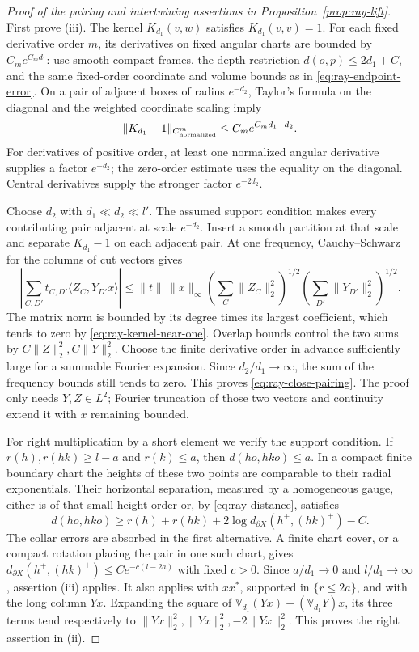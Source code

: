 \begin{proof}[Proof of the pairing and intertwining assertions in
Proposition~\ref{prop:ray-lift}]
First prove (iii).  The kernel \(K_{d_1}(v,w)\) satisfies
\(K_{d_1}(v,v)=1\).  For each fixed derivative order \(m\), its
derivatives on fixed angular charts are bounded by
\(C_m e^{C_m {d_1}}\): use smooth compact frames, the depth restriction
\(d(o,p)\le2{d_1}+C\), and the same fixed-order coordinate and volume
bounds as in \eqref{eq:ray-endpoint-error}.  On a pair of
adjacent boxes of radius \(e^{-d_2}\), Taylor's formula on the
diagonal and the weighted coordinate scaling imply
\begin{equation}\label{eq:ray-kernel-near-one}
 \|K_{d_1}-1\|_{C^m_{\rm normalized}}
                  \le C_m e^{C_m {d_1}-d_2}.
\end{equation}
For derivatives of positive order, at least one normalized angular
derivative supplies a factor \(e^{-d_2}\); the zero-order estimate
uses the equality on the diagonal.  Central derivatives supply
the stronger factor \(e^{-2d_2}\).

Choose \(d_2\) with \({d_1}\ll d_2\ll l'\).  The assumed support
condition makes every contributing pair adjacent at scale
\(e^{-d_2}\).  Insert a smooth partition at that scale and separate
\(K_{d_1}-1\) on each adjacent pair.  At one frequency, Cauchy--Schwarz
for the columns of cut vectors gives
\[
 \left|\sum_{C,D'}t_{C,D'}\langle Z_C,Y_{D'}x\rangle\right|
 \le\|t\|\,\|x\|_\infty
       \left(\sum_C\|Z_C\|_2^2\right)^{1/2}
       \left(\sum_{D'}\|Y_{D'}\|_2^2\right)^{1/2}.
\]
The matrix norm is bounded by its degree times its largest
coefficient, which tends to zero by
\eqref{eq:ray-kernel-near-one}.  Overlap bounds control
the two sums by \(C\|Z\|_2^2,C\|Y\|_2^2\).
Choose the finite derivative order in advance sufficiently large
for a summable Fourier expansion.  Since \(d_2/{d_1}\to\infty\), the
sum of the frequency bounds still tends to zero.  This proves
\eqref{eq:ray-close-pairing}.  The proof only needs
\(Y,Z\in L^2\); Fourier truncation of those two vectors and
continuity extend it with \(x\) remaining bounded.

For right multiplication by a short element we verify the support
condition.  If \(r(h),r(hk)\ge l-a\) and \(r(k)\le a\), then
\(d(ho,hko)\le a\).  In a compact finite boundary chart the
heights of these two points are comparable to their radial
exponentials.  Their horizontal separation, measured by a
homogeneous gauge, either is of that small height order or, by
\eqref{eq:ray-distance}, satisfies
\[
 d(ho,hko)\ge r(h)+r(hk)
       +2\log d_{\partial X}(h^+,(hk)^+)-C.
\]
The collar errors are absorbed in the first alternative.  A finite
chart cover, or a compact rotation placing the pair in one such
chart, gives
\(d_{\partial X}(h^+,(hk)^+)\le Ce^{-c(l-2a)}\)
with fixed \(c>0\).  Since \(a/{d_1}\to0\) and \(l/{d_1}\to\infty\),
assertion (iii) applies.  It also applies with \(xx^*\), supported
in \(\{r\le2a\}\), and with the long column \(Yx\).
Expanding the square of
\(\mathbb V_{d_1}(Yx)-(\mathbb V_{d_1}Y)x\), its three terms tend respectively
to \(\|Yx\|_2^2,\|Yx\|_2^2,-2\|Yx\|_2^2\).
This proves the right assertion in (ii).


\end{proof}
